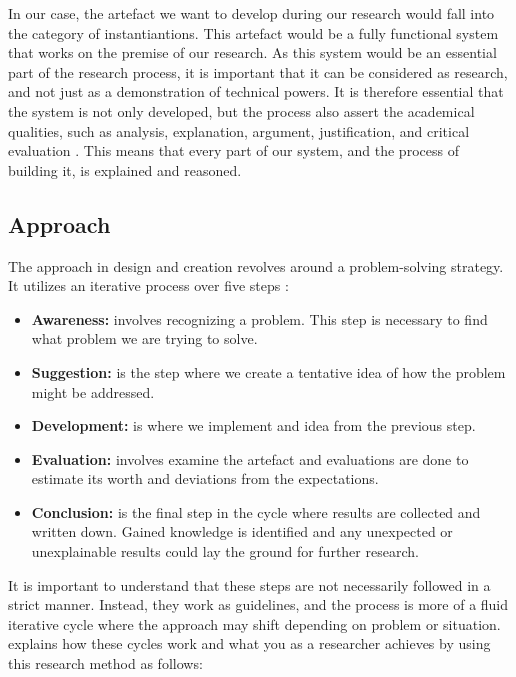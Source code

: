 In our case, the artefact we want to develop during our research would fall into the category of instantiantions. This artefact would be a fully functional system that works on the premise of our research.  As this system would be an essential part of the research process, it is important that it can be considered as research, and not just as a demonstration of technical powers. It is therefore essential that the system is not only developed, but the process also assert the academical qualities, such as analysis, explanation, argument, justification, and critical evaluation \citep{oates2005researching}. This means that every part of our system, and the process of building it, is explained and reasoned.

\subsection{Approach}
\label{methodology-design-and-creation-approach}
The approach in design and creation revolves around a problem-solving strategy. It utilizes an iterative process over five steps \citep{vaishnavi2004design, oates2005researching}:

\begin{itemize}
    \item\textbf{Awareness:} involves recognizing a problem. This step is necessary to find what problem we are trying to solve.
    \item\textbf{Suggestion:} is the step where we create a tentative idea of how the problem might be addressed.
    \item\textbf{Development:} is where we implement and idea from the previous step.
    \item\textbf{Evaluation:} involves examine the artefact and evaluations are done to estimate its worth and deviations from the expectations.
    \item\textbf{Conclusion:} is the final step in the cycle where results are collected and written down. Gained knowledge is identified and any unexpected or unexplainable results could lay the ground for further research.
\end{itemize}

It is important to understand that these steps are not necessarily followed in a strict manner. Instead, they work as guidelines, and the process is more of a fluid iterative cycle where the approach may shift depending on problem or situation. \citep{oates2005researching} explains how these cycles work and what you as a researcher achieves by using this research method as follows:

